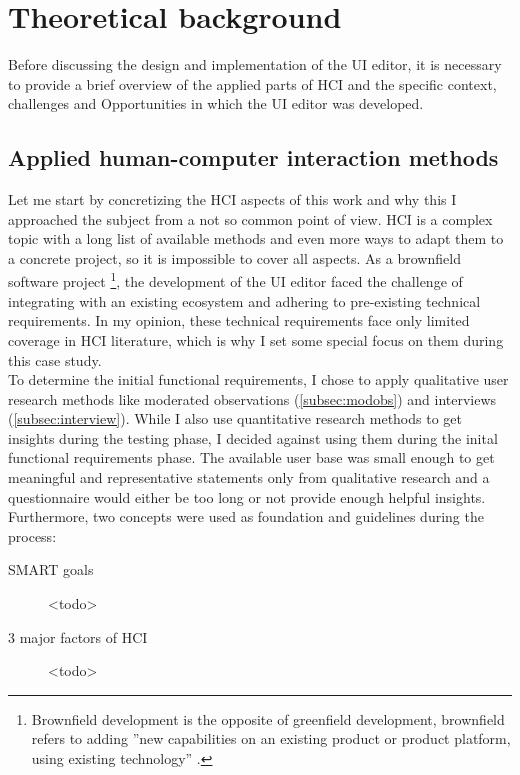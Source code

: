 
%
\chapter{Theoretical background}
\label{chap:background}

Before discussing the design and implementation of the UI editor, it is necessary to provide a brief overview of the applied parts of HCI and the specific context, challenges and Opportunities in which the UI editor was developed.
% 

\section{Applied human-computer interaction methods}

Let me start by concretizing the HCI aspects of this work and why this I approached the subject from a not so common point of view.
HCI is a complex topic with a long list of available methods and even more ways to adapt them to a concrete project, so it is impossible to cover all aspects.
As a brownfield software project
\footnote{Brownfield development is the opposite of greenfield development, brownfield refers to adding ''new capabilities on an existing product or product platform, using existing technology'' \cite{BrownfieldToGreenfield:2021ys}.},
the development of the UI editor faced the challenge of integrating with an existing ecosystem and adhering to pre-existing technical requirements.
In my opinion, these technical requirements face only limited coverage in HCI literature, which is why I set some special focus on them during this case study.
\\
To determine the initial functional requirements, I chose to apply qualitative user research methods like moderated observations (\ref{subsec:modobs}) and interviews (\ref{subsec:interview}).
While I also use quantitative research methods to get insights during the testing phase, I decided against using them during the inital functional requirements phase.
The available user base was small enough to get meaningful and representative statements only from qualitative research and a questionnaire would either be too long or not provide enough helpful insights.
\\
Furthermore, two concepts were used as foundation and guidelines during the process:
\begin{description}
  \item[SMART goals] <todo> 
  \item[3 major factors of HCI] <todo> 
\end{description}

